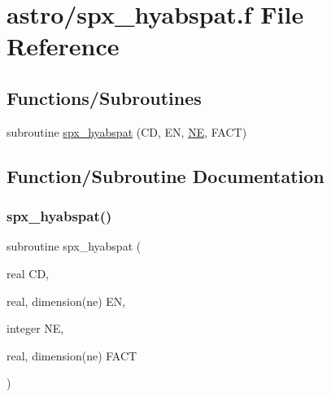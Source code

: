 \hypertarget{spx__hyabspat_8f}{}\section{astro/spx\+\_\+hyabspat.f File Reference}
\label{spx__hyabspat_8f}
\subsection*{Functions/\+Subroutines}
\begin{DoxyCompactItemize}
\item 
subroutine \hyperlink{spx__hyabspat_8f_a6eaf88a163ee35280425450d99622271}{spx\+\_\+hyabspat} (CD, EN, \hyperlink{eval__tab_8h_a5af9139e882aef6c820ae908589a40d6}{NE}, F\+A\+CT)
\end{DoxyCompactItemize}


\subsection{Function/\+Subroutine Documentation}
\mbox{\label{spx__hyabspat_8f_a6eaf88a163ee35280425450d99622271}} 
\subsubsection{\texorpdfstring{spx\+\_\+hyabspat()}{spx\_hyabspat()}}
{\footnotesize\ttfamily subroutine spx\+\_\+hyabspat (\begin{DoxyParamCaption}\item[{real}]{CD,  }\item[{real, dimension(ne)}]{EN,  }\item[{integer}]{NE,  }\item[{real, dimension(ne)}]{F\+A\+CT }\end{DoxyParamCaption})}

